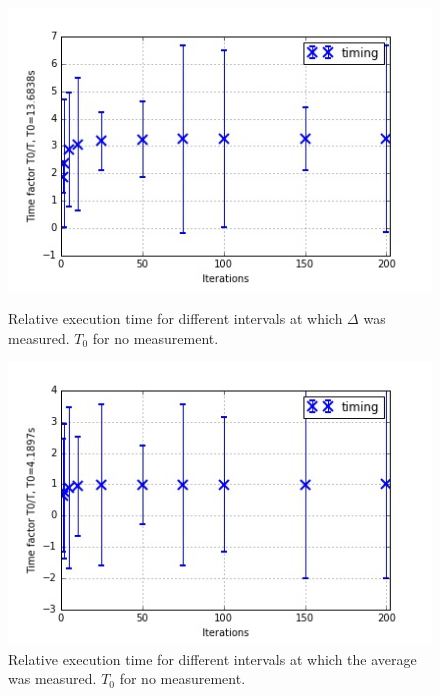 \documentclass[11pt]{article}
\begin{document}
	\begin{figure}[ht]	
		\centering
		\begin{minipage}[b]{.5\textwidth}	
			\centering
			\includegraphics[width=\linewidth]{itervs4.jpeg}
			\caption{Relative execution time for different intervals at which $\Delta$ was measured. $T_0$ for no measurement.}\label{iter4}
		\end{minipage}%
		\begin{minipage}[b]{.5\textwidth}
			\centering
			\includegraphics[width=\linewidth]{itervs5.jpeg}
			\caption{Relative execution time for different intervals at which the average was measured. $T_0$ for no measurement.}\label{iter5}
		\end{minipage}
	\end{figure}
	
	
	
\end{document}
